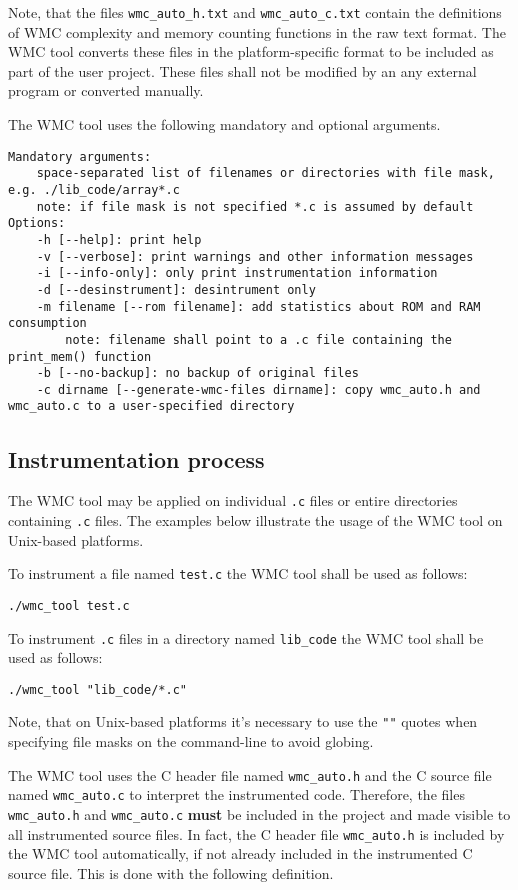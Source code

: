 Note, that the files \verb|wmc_auto_h.txt| and \verb|wmc_auto_c.txt| contain the definitions of WMC complexity and memory counting functions in the raw text format. The WMC tool converts these files in the platform-specific format to be included as part of the user project. These files shall not be modified by an any external program or converted manually.

The WMC tool uses the following mandatory and optional arguments.

\begin{Verbatim}[fontsize=\scriptsize]
Mandatory arguments:
    space-separated list of filenames or directories with file mask, e.g. ./lib_code/array*.c
    note: if file mask is not specified *.c is assumed by default
Options:
    -h [--help]: print help
    -v [--verbose]: print warnings and other information messages
    -i [--info-only]: only print instrumentation information
    -d [--desinstrument]: desintrument only
    -m filename [--rom filename]: add statistics about ROM and RAM consumption
        note: filename shall point to a .c file containing the print_mem() function
    -b [--no-backup]: no backup of original files
    -c dirname [--generate-wmc-files dirname]: copy wmc_auto.h and wmc_auto.c to a user-specified directory
\end{Verbatim}

\subsection{Instrumentation process}
\label{ch:instrumentation_process}

The WMC tool may be applied on individual \verb|.c| files or entire directories containing \verb|.c| files. The examples below illustrate the usage of the WMC tool on Unix-based platforms.

To instrument a file named \verb|test.c| the WMC tool shall be used as follows:

\verb|./wmc_tool test.c|

To instrument \verb|.c| files in a directory named \verb|lib_code| the WMC tool shall be used as follows:

\verb|./wmc_tool "lib_code/*.c"|

Note, that on Unix-based platforms it's necessary to use the \verb|""| quotes when specifying file masks on the command-line to avoid globing. 

The WMC tool uses the C header file named \verb|wmc_auto.h| and the C source file named \verb|wmc_auto.c| to interpret the instrumented code. Therefore, the files \verb|wmc_auto.h| and \verb|wmc_auto.c| \textbf{must} be included in the project and made visible to all instrumented source files. In fact, the C header file \verb|wmc_auto.h| is included by the WMC tool automatically, if not already included in the instrumented C source file. This is done with the following definition.

